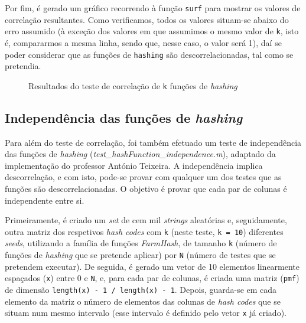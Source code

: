 \documentclass[a4paper,11pt,openright,oneside]{report}
\begin{document}
Por fim, é gerado um gráfico recorrendo à função \texttt{surf} para mostrar os valores de correlação resultantes. Como verificamos, todos os valores situam-se abaixo do erro assumido (à exceção dos valores em que assumimos o mesmo valor de \texttt{k}, isto é, compararmos a mesma linha, sendo que, nesse caso, o valor será 1), daí se poder considerar que as funções de \texttt{hashing} são descorrelacionadas, tal como se pretendia.

\begin{figure}[ht]	
\center
{}
\caption{Resultados do teste de correlação de \texttt{k} funções de \textit{hashing}}
\label{fig:hashcorr}
\end{figure}

\subsection{Independência das funções de \textit{hashing}}
\label{subsec.hashindep}

Para além do teste de correlação, foi também efetuado um teste de independência das funções de \textit{hashing} (\textit{test\_hashFunction\_independence.m}), adaptado da implementação do professor António Teixeira. A independência implica descorrelação, e com isto, pode-se provar com qualquer um dos testes que as funções são descorrelacionadas. O objetivo é provar que cada par de colunas é independente entre si.

Primeiramente, é criado um \textit{set} de cem mil \textit{strings} aleatórias e, seguidamente, outra matriz dos respetivos \textit{hash codes} com \texttt{k} (neste teste, \texttt{k = 10}) diferentes \textit{seeds}, utilizando a família de funções \textit{FarmHash}, de tamanho \texttt{k} (número de funções de \textit{hashing} que se pretende aplicar) por \texttt{N} (número de testes que se pretendem executar). De seguida, é gerado um vetor de 10 elementos linearmente espaçados (\texttt{x}) entre 0 e \texttt{N}, e, para cada par de colunas, é criada uma matriz (\texttt{pmf}) de dimensão \texttt{length(x) - 1 / length(x) - 1}. Depois, guarda-se em cada elemento da matriz o número de elementos das colunas de \textit{hash codes} que se situam num mesmo intervalo (esse intervalo é definido pelo vetor \texttt{x} já criado).
\end{document}
